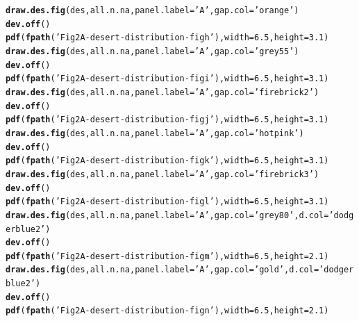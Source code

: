 \documentclass{article}\usepackage[]{graphicx}\usepackage[]{color}
\makeatletter
\newcommand{\hlnum}[1]{\textcolor[rgb]{0.686,0.059,0.569}{#1}}%
\newcommand{\hlstr}[1]{\textcolor[rgb]{0.192,0.494,0.8}{#1}}%
\newcommand{\hlstd}[1]{\textcolor[rgb]{0.345,0.345,0.345}{#1}}%
\newcommand{\hlkwc}[1]{\textcolor[rgb]{0.333,0.667,0.333}{#1}}%
\newcommand{\hlkwd}[1]{\textcolor[rgb]{0.737,0.353,0.396}{\textbf{#1}}}%
\newenvironment{kframe}{%
 \def\at@end@of@kframe{}%
 \ifinner\ifhmode%
  \def\at@end@of@kframe{\end{minipage}}%
  \begin{minipage}{\columnwidth}%
 \fi\fi%
 \def\FrameCommand##1{\hskip\@totalleftmargin \hskip-\fboxsep
 \colorbox{shadecolor}{##1}\hskip-\fboxsep
     \hskip-\linewidth \hskip-\@totalleftmargin \hskip\columnwidth}%
 \MakeFramed {\advance\hsize-\width
   \@totalleftmargin\z@ \linewidth\hsize
   \@setminipage}}%
 {\par\unskip\endMakeFramed%
 \at@end@of@kframe}
\newenvironment{knitrout}{}{} %
\makeatother
\begin{document}
\begin{knitrout}
\begin{kframe}
\begin{alltt}
  \hlkwd{draw.des.fig}\hlstd{(des, all.n.na,} \hlkwc{panel.label}\hlstd{=}\hlstr{'A'}\hlstd{,}\hlkwc{gap.col} \hlstd{=} \hlstr{'orange'}\hlstd{)}
  \hlkwd{dev.off}\hlstd{()}
  \hlkwd{pdf}\hlstd{(}\hlkwd{fpath}\hlstd{(}\hlstr{'Fig2A-desert-distribution-figh'}\hlstd{),} \hlkwc{width}\hlstd{=}\hlnum{6.5}\hlstd{,} \hlkwc{height}\hlstd{=}\hlnum{3.1}\hlstd{)}
  \hlkwd{draw.des.fig}\hlstd{(des, all.n.na,} \hlkwc{panel.label}\hlstd{=}\hlstr{'A'}\hlstd{,}\hlkwc{gap.col} \hlstd{=} \hlstr{'grey55'}\hlstd{)}
  \hlkwd{dev.off}\hlstd{()}
  \hlkwd{pdf}\hlstd{(}\hlkwd{fpath}\hlstd{(}\hlstr{'Fig2A-desert-distribution-figi'}\hlstd{),} \hlkwc{width}\hlstd{=}\hlnum{6.5}\hlstd{,} \hlkwc{height}\hlstd{=}\hlnum{3.1}\hlstd{)}
  \hlkwd{draw.des.fig}\hlstd{(des, all.n.na,} \hlkwc{panel.label}\hlstd{=}\hlstr{'A'}\hlstd{,}\hlkwc{gap.col} \hlstd{=} \hlstr{'firebrick2'}\hlstd{)}
  \hlkwd{dev.off}\hlstd{()}
  \hlkwd{pdf}\hlstd{(}\hlkwd{fpath}\hlstd{(}\hlstr{'Fig2A-desert-distribution-figj'}\hlstd{),} \hlkwc{width}\hlstd{=}\hlnum{6.5}\hlstd{,} \hlkwc{height}\hlstd{=}\hlnum{3.1}\hlstd{)}
  \hlkwd{draw.des.fig}\hlstd{(des, all.n.na,} \hlkwc{panel.label}\hlstd{=}\hlstr{'A'}\hlstd{,}\hlkwc{gap.col} \hlstd{=} \hlstr{'hotpink'}\hlstd{)}
  \hlkwd{dev.off}\hlstd{()}
  \hlkwd{pdf}\hlstd{(}\hlkwd{fpath}\hlstd{(}\hlstr{'Fig2A-desert-distribution-figk'}\hlstd{),} \hlkwc{width}\hlstd{=}\hlnum{6.5}\hlstd{,} \hlkwc{height}\hlstd{=}\hlnum{3.1}\hlstd{)}
  \hlkwd{draw.des.fig}\hlstd{(des, all.n.na,} \hlkwc{panel.label}\hlstd{=}\hlstr{'A'}\hlstd{,}\hlkwc{gap.col} \hlstd{=} \hlstr{'firebrick3'}\hlstd{)}
  \hlkwd{dev.off}\hlstd{()}
  \hlkwd{pdf}\hlstd{(}\hlkwd{fpath}\hlstd{(}\hlstr{'Fig2A-desert-distribution-figl'}\hlstd{),} \hlkwc{width}\hlstd{=}\hlnum{6.5}\hlstd{,} \hlkwc{height}\hlstd{=}\hlnum{3.1}\hlstd{)}
  \hlkwd{draw.des.fig}\hlstd{(des, all.n.na,} \hlkwc{panel.label}\hlstd{=}\hlstr{'A'}\hlstd{,}\hlkwc{gap.col} \hlstd{=} \hlstr{'grey80'}\hlstd{,}\hlkwc{d.col}\hlstd{=}\hlstr{'dodgerblue2'}\hlstd{)}
  \hlkwd{dev.off}\hlstd{()}
  \hlkwd{pdf}\hlstd{(}\hlkwd{fpath}\hlstd{(}\hlstr{'Fig2A-desert-distribution-figm'}\hlstd{),} \hlkwc{width}\hlstd{=}\hlnum{6.5}\hlstd{,} \hlkwc{height}\hlstd{=}\hlnum{2.1}\hlstd{)}
  \hlkwd{draw.des.fig}\hlstd{(des, all.n.na,} \hlkwc{panel.label}\hlstd{=}\hlstr{'A'}\hlstd{,}\hlkwc{gap.col} \hlstd{=} \hlstr{'gold'}\hlstd{,}\hlkwc{d.col}\hlstd{=}\hlstr{'dodgerblue2'}\hlstd{)}
  \hlkwd{dev.off}\hlstd{()}
  \hlkwd{pdf}\hlstd{(}\hlkwd{fpath}\hlstd{(}\hlstr{'Fig2A-desert-distribution-fign'}\hlstd{),} \hlkwc{width}\hlstd{=}\hlnum{6.5}\hlstd{,} \hlkwc{height}\hlstd{=}\hlnum{2.1}\hlstd{)}

\end{alltt}
\end{kframe}
\end{knitrout}
\end{document}
